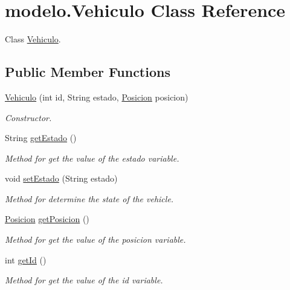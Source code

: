 \hypertarget{classmodelo_1_1_vehiculo}{}\section{modelo.\+Vehiculo Class Reference}
\label{classmodelo_1_1_vehiculo}


Class \mbox{\hyperlink{classmodelo_1_1_vehiculo}{Vehiculo}}.  


\subsection*{Public Member Functions}
\begin{DoxyCompactItemize}
\item 
\mbox{\hyperlink{classmodelo_1_1_vehiculo_abff5e22c6b50ca2cefb6cb06e358e710}{Vehiculo}} (int id, String estado, \mbox{\hyperlink{classmodelo_1_1_posicion}{Posicion}} posicion)
\begin{DoxyCompactList}\small\item\em Constructor. \end{DoxyCompactList}\item 
String \mbox{\hyperlink{classmodelo_1_1_vehiculo_afc2b35fba98cc54bd67dd922db3bdc5e}{get\+Estado}} ()
\begin{DoxyCompactList}\small\item\em Method for get the value of the estado variable. \end{DoxyCompactList}\item 
void \mbox{\hyperlink{classmodelo_1_1_vehiculo_af8ba11f972f7cafec1e4f2379072c297}{set\+Estado}} (String estado)
\begin{DoxyCompactList}\small\item\em Method for determine the state of the vehicle. \end{DoxyCompactList}\item 
\mbox{\hyperlink{classmodelo_1_1_posicion}{Posicion}} \mbox{\hyperlink{classmodelo_1_1_vehiculo_a6ac6859c6824cee3ce3c8c1838fd99bd}{get\+Posicion}} ()
\begin{DoxyCompactList}\small\item\em Method for get the value of the posicion variable. \end{DoxyCompactList}\item 
int \mbox{\hyperlink{classmodelo_1_1_vehiculo_ac147041ca1529b3f926a16f67aeacbd7}{get\+Id}} ()
\begin{DoxyCompactList}\small\item\em Method for get the value of the id variable. \end{DoxyCompactList}\item 

\end{DoxyCompactItemize}
